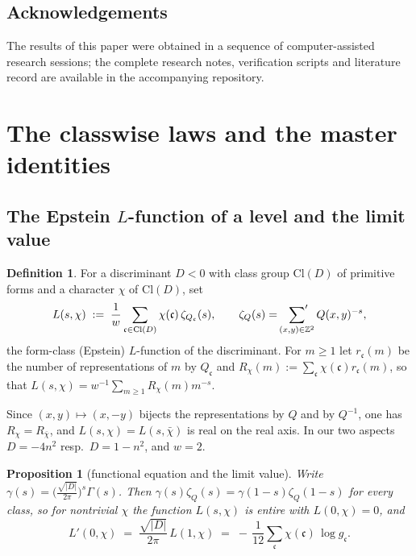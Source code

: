 \documentclass[11pt]{amsart}
\numberwithin{equation}{section}
\theoremstyle{plain}
\newtheorem{proposition}[theorem]{Proposition}
\theoremstyle{definition}
\newtheorem{definition}[theorem]{Definition}
\theoremstyle{remark}
\newcommand{\Z}{\mathbb{Z}}
\newcommand{\Cl}{\mathrm{Cl}}
\newcommand{\idealc}{\mathfrak{c}}
\begin{document}
\subsection*{Acknowledgements}
The results of this paper were obtained in a sequence of
computer-assisted research sessions; the complete research notes,
verification scripts and literature record are available in the
accompanying repository.

\section{The classwise laws and the master identities}\label{sec:master}

\subsection{The Epstein $L$-function of a level and the limit value}
\label{subsec:epstein}

\begin{definition}\label{def:epstein}
For a discriminant $D < 0$ with class group $\Cl(D)$ of primitive forms
and a character $\chi$ of $\Cl(D)$, set
\[
  L(s,\chi) \;:=\; \frac1w\sum_{\idealc \in \Cl(D)}\chi(\idealc)\,
  \zeta_{Q_\idealc}(s),
  \qquad
  \zeta_Q(s) = \sideset{}{'}\sum_{(x,y)\in\Z^2}Q(x,y)^{-s},
\]
the form-class (Epstein) $L$-function of the discriminant.  For $m \ge
1$ let $r_\idealc(m)$ be the number of representations of $m$ by
$Q_\idealc$ and $R_\chi(m) := \sum_\idealc\chi(\idealc)r_\idealc(m)$, so
that $L(s,\chi) = w^{-1}\sum_{m \ge 1}R_\chi(m)m^{-s}$.
\end{definition}

Since $(x,y) \mapsto (x,-y)$ bijects the representations by $Q$ and by
$Q^{-1}$, one has $R_\chi = R_{\bar\chi}$, and $L(s,\chi) = L(s,\bar\chi)$
is real on the real axis.  In our two aspects $D = -4n^2$ resp.\ $D = 1
- n^2$, and $w = 2$.

\begin{proposition}[functional equation and the limit value]\label{prop:klf}
Write $\gamma(s) = \bigl(\tfrac{\sqrt{|D|}}{2\pi}\bigr)^{s}\Gamma(s)$.
Then $\gamma(s)\zeta_Q(s) = \gamma(1-s)\zeta_Q(1-s)$ for every class, so
for nontrivial $\chi$ the function $L(s,\chi)$ is entire with $L(0,\chi)
= 0$, and
\begin{equation}\label{eq:klf}
  L'(0,\chi) \;=\; \frac{\sqrt{|D|}}{2\pi}\,L(1,\chi)
  \;=\; -\,\frac{1}{12}\sum_{\idealc}\chi(\idealc)\,\log g_\idealc .
\end{equation}
\end{proposition}
\end{document}
